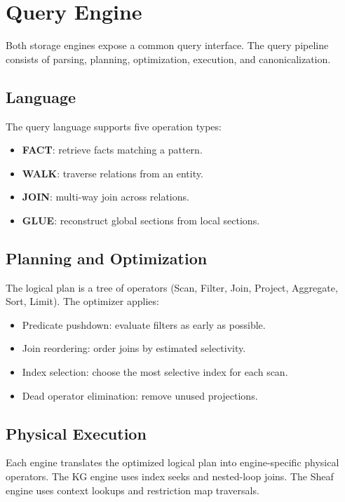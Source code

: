 \section{Query Engine}
\label{sec:query-engine}

Both storage engines expose a common query interface. The query pipeline
consists of parsing, planning, optimization, execution, and
canonicalization.

\subsection{Language}
\label{sec:query:language}

The query language supports five operation types:
\begin{itemize}
    \item \textbf{FACT}: retrieve facts matching a pattern.
    \item \textbf{WALK}: traverse relations from an entity.
    \item \textbf{JOIN}: multi-way join across relations.
    \item \textbf{GLUE}: reconstruct global sections from local sections.
\end{itemize}

\subsection{Planning and Optimization}
\label{sec:query:planner}

The logical plan is a tree of operators (Scan, Filter, Join, Project,
Aggregate, Sort, Limit). The optimizer applies:
\begin{itemize}
    \item Predicate pushdown: evaluate filters as early as possible.
    \item Join reordering: order joins by estimated selectivity.
    \item Index selection: choose the most selective index for each scan.
    \item Dead operator elimination: remove unused projections.
\end{itemize}

\subsection{Physical Execution}
\label{sec:query:execution}

Each engine translates the optimized logical plan into engine-specific
physical operators. The KG engine uses index seeks and nested-loop joins.
The Sheaf engine uses context lookups and restriction map traversals.
